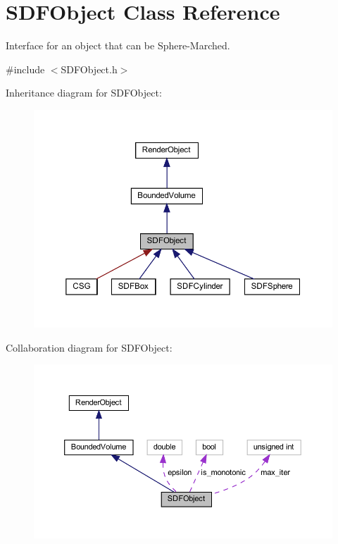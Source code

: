 \hypertarget{classSDFObject}{}\section{S\+D\+F\+Object Class Reference}
\label{classSDFObject}


Interface for an object that can be Sphere-\/\+Marched.  




{\ttfamily \#include $<$S\+D\+F\+Object.\+h$>$}



Inheritance diagram for S\+D\+F\+Object\+:
\nopagebreak
\begin{figure}[H]
\begin{center}
\leavevmode
\includegraphics[width=350pt]{classSDFObject__inherit__graph}
\end{center}
\end{figure}


Collaboration diagram for S\+D\+F\+Object\+:
\nopagebreak
\begin{figure}[H]
\begin{center}
\leavevmode
\includegraphics[width=350pt]{classSDFObject__coll__graph}
\end{center}
\end{figure}
